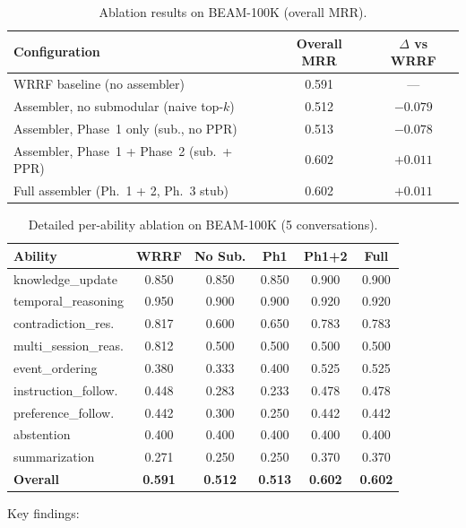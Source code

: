 \documentclass[11pt]{article}
\begin{document}
\begin{table}[t]
\centering
\caption{Ablation results on BEAM-100K (overall MRR).}
\label{tab:ablation-overall}
\begin{tabular}{lcc}
\toprule
Configuration & Overall MRR & $\Delta$ vs WRRF \\
\midrule
WRRF baseline (no assembler) & 0.591 & --- \\
Assembler, no submodular (naive top-$k$) & 0.512 & $-0.079$ \\
Assembler, Phase~1 only (sub., no PPR) & 0.513 & $-0.078$ \\
Assembler, Phase~1 + Phase~2 (sub.\ + PPR) & 0.602 & $+0.011$ \\
Full assembler (Ph.\ 1 + 2, Ph.\ 3 stub) & 0.602 & $+0.011$ \\
\bottomrule
\end{tabular}
\end{table}

\begin{table}[t]
\centering
\caption{Detailed per-ability ablation on BEAM-100K (5 conversations).}
\label{tab:ablation-detail}
\small
\begin{tabular}{lccccc}
\toprule
Ability & WRRF & No Sub. & Ph1 & Ph1+2 & Full \\
\midrule
knowledge\_update & 0.850 & 0.850 & 0.850 & 0.900 & 0.900 \\
temporal\_reasoning & 0.950 & 0.900 & 0.900 & 0.920 & 0.920 \\
contradiction\_res. & 0.817 & 0.600 & 0.650 & 0.783 & 0.783 \\
multi\_session\_reas. & 0.812 & 0.500 & 0.500 & 0.500 & 0.500 \\
event\_ordering & 0.380 & 0.333 & 0.400 & 0.525 & 0.525 \\
instruction\_follow. & 0.448 & 0.283 & 0.233 & 0.478 & 0.478 \\
preference\_follow. & 0.442 & 0.300 & 0.250 & 0.442 & 0.442 \\
abstention & 0.400 & 0.400 & 0.400 & 0.400 & 0.400 \\
summarization & 0.271 & 0.250 & 0.250 & 0.370 & 0.370 \\
\midrule
\textbf{Overall} & \textbf{0.591} & \textbf{0.512} & \textbf{0.513} & \textbf{0.602} & \textbf{0.602} \\
\bottomrule
\end{tabular}
\end{table}

Key findings:
\end{document}
